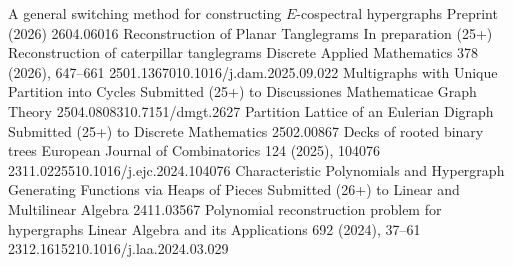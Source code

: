 \begin{paperlist}
{A general switching method for constructing $E$-cospectral hypergraphs}
{Preprint (2026)}
{2604.06016}{}
{Reconstruction of Planar Tanglegrams}
{In preparation (25+)}
{}{}
{Reconstruction of caterpillar tanglegrams}
{Discrete Applied Mathematics 378 (2026), 647--661}
{2501.13670}{10.1016/j.dam.2025.09.022}
{Multigraphs with Unique Partition into Cycles}
{Submitted (25+) to Discussiones Mathematicae Graph Theory}
{2504.08083}{10.7151/dmgt.2627}
{Partition Lattice of an Eulerian Digraph}
{Submitted (25+) to Discrete Mathematics}
{2502.00867}{}
{Decks of rooted binary trees}
{European Journal of Combinatorics 124 (2025), 104076}
{2311.02255}{10.1016/j.ejc.2024.104076}
{Characteristic Polynomials and Hypergraph Generating Functions via Heaps of Pieces}
{Submitted (26+) to Linear and Multilinear Algebra}
{2411.03567}{}
{Polynomial reconstruction problem for hypergraphs}
{Linear Algebra and its Applications 692 (2024), 37--61}
{2312.16152}{10.1016/j.laa.2024.03.029}
\end{paperlist}
